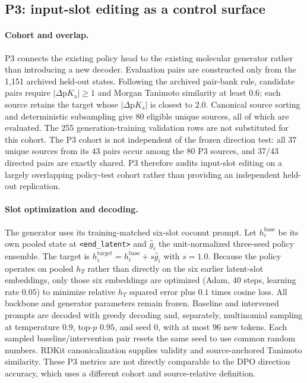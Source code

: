\documentclass[11pt]{article}
\newcommand{\pka}{\mathrm{p}K_{\mathrm a}}
\begin{document}
\subsection{P3: input-slot editing as a control surface}
\label{sec:p3_methods}

\paragraph{Cohort and overlap.} P3 connects the existing policy head to the existing molecular generator rather than introducing a new decoder. Evaluation pairs are constructed only from the 1{,}151 archived held-out states. Following the archived pair-bank rule, candidate pairs require $|\Delta\pka|\geq1$ and Morgan Tanimoto similarity at least $0.6$; each source retains the target whose $|\Delta\pka|$ is closest to $2.0$. Canonical source sorting and deterministic subsampling give 80 eligible unique sources, all of which are evaluated. The 255 generation-training validation rows are not substituted for this cohort. The P3 cohort is not independent of the frozen direction test: all 37 unique sources from its 43 pairs occur among the 80 P3 sources, and 37/43 directed pairs are exactly shared. P3 therefore audits input-slot editing on a largely overlapping policy-test cohort rather than providing an independent held-out replication.

\paragraph{Slot optimization and decoding.} The generator uses its training-matched six-slot coconut prompt. Let $h_i^{\mathrm{base}}$ be its own pooled state at \texttt{<end\_latent>} and $\hat g_i$ the unit-normalized three-seed policy ensemble. The target is $h_i^{\mathrm{target}}=h_i^{\mathrm{base}}+s\hat g_i$ with $s=1.0$. Because the policy operates on pooled $h_T$ rather than directly on the six earlier latent-slot embeddings, only those six embeddings are optimized (Adam, 40 steps, learning rate $0.05$) to minimize relative $h_T$ squared error plus $0.1$ times cosine loss. All backbone and generator parameters remain frozen. Baseline and intervened prompts are decoded with greedy decoding and, separately, multinomial sampling at temperature $0.9$, top-$p$ $0.95$, and seed 0, with at most 96 new tokens. Each sampled baseline/intervention pair resets the same seed to use common random numbers. RDKit canonicalization supplies validity and source-anchored Tanimoto similarity. These P3 metrics are not directly comparable to the DPO direction accuracy, which uses a different cohort and source-relative definition.
\end{document}

